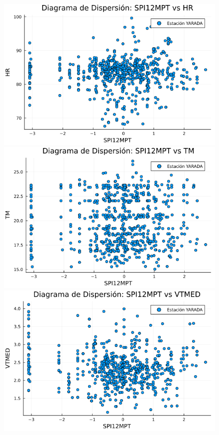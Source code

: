 \begin{figure}[htbp]
\begin{minipage}{0.32\textwidth}
    \centering
    \includegraphics[width=\linewidth]{Capitulos/Scaterplot/YARADA_SPI12MPT_vs_HR.png}
\end{minipage}\hfill
\begin{minipage}{0.32\textwidth}
    \centering
    \includegraphics[width=\linewidth]{Capitulos/Scaterplot/YARADA_SPI12MPT_vs_TM.png}
\end{minipage}\hfill
\begin{minipage}{0.32\textwidth}
    \centering
    \includegraphics[width=\linewidth]{Capitulos/Scaterplot/YARADA_SPI12MPT_vs_VTMED.png}
\end{minipage}


\end{figure}
